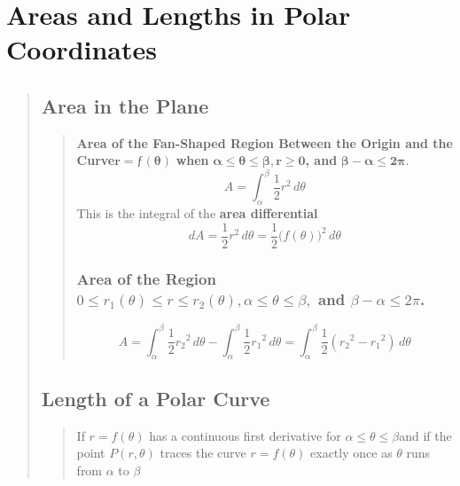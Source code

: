 \documentclass{report}
\begin{document}
\section{Areas and Lengths in Polar Coordinates  }
\begin{quote}

	\subsection{Area in the Plane}
	\begin{quote}

		\textbf{Area of the Fan-Shaped Region Between the Origin and the Curve}$\mathbf{r = ƒ(\theta)}$ \textbf{when} $\mathbf{\alpha\leq\theta\leq\beta, r \geq 0}$\textbf{, and} $\mathbf{\beta-\alpha\leq 2\pi}$.
		$$A = \int_{\alpha}^{\beta}\frac{1}{2}r^2 \,d\theta$$
		This is the integral of the \textbf{area differential}
		$$dA = \frac{1}{2}r^2\, d\theta = \frac{1}{2}\Big ( f\left (\theta \right )\Big )^2\, d\theta$$


		\subsubsection{Area of the Region $0\leq r_1(\theta)\leq r\leq r_2(\theta),\alpha\leq\theta\leq\beta,$ and $\beta - \alpha \leq 2\pi$.}
		$$A = \int_{\alpha}^{\beta}\frac{1}{2}{r_2}^2\,d\theta - \int_{\alpha}^{\beta}\frac{1}{2}{r_1}^2 \,d\theta = \int_{\alpha}^{\beta}\frac{1}{2}({r_2}^2-{r_1}^2)\, d\theta$$
	\end{quote}

	\subsection{Length of a Polar Curve}
	\begin{quote}

		If $r = f(\theta)$ has a continuous first derivative for $\alpha\leq\theta\leq\beta$and if the point $P(r,\theta)$ traces the curve $r = f(\theta)$ exactly once as $\theta$ runs from $\alpha$ to $\beta$

	\end{quote}

\end{quote}
\end{document}
